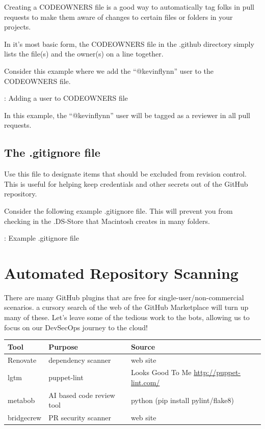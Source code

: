 \justifying
Creating a CODEOWNERS file is a good way to automatically tag folks in pull requests to make them aware of
changes to certain files or folders in your projects.

\justifying
In it's most basic form, the CODEOWNERS file in the .github directory simply lists the file(s) and the owner(s) on a line together.

\justifying
Consider this example where we add the ``@kevinflynn'' user to the CODEOWNERS file.

\begin{mybox}{\thetcbcounter: Adding a user to CODEOWNERS file}
      
\end{mybox}

\justifying
In this example, the ``@kevinflynn'' user will be tagged as a reviewer in all pull requests.

\subsection{The .gitignore file}

\justifying
Use this file to designate items that should be excluded from revision
control. This is useful for helping keep credentials and other secrets out of the GitHub repository.

\justifying
Consider the following example .gitignore file. This will prevent you from checking in the .DS-Store that
Macintosh creates in many folders.

\begin{mybox}{\thetcbcounter: Example .gitignore file}
      
\end{mybox}

\section{Automated Repository Scanning}

\justifying
There are many GitHub plugins that are free for single-user/non-commercial scenarios. a cursory search of the web of the
GitHub Marketplace will turn up many of these. Let's leave some of the
tedious work to the bots, allowing us to focus on our DevSecOps journey to the cloud!

\justifying
\begin{tabular}{| p{2.3cm}| p{4.5cm} | p{8.5cm} |}
      \hline
     \textbf{Tool}& \textbf{Purpose}& \textbf{Source} \\
      \hline
      Renovate & dependency scanner & web site \\
      \hline
      lgtm & puppet-lint & Looks Good To Me \url{http://puppet-lint.com/} \\
      \hline
      metabob & AI based code review tool & python (pip install pylint/flake8) \\
      \hline
      bridgecrew & PR security scanner & web site \\
      \hline
\end{tabular}

